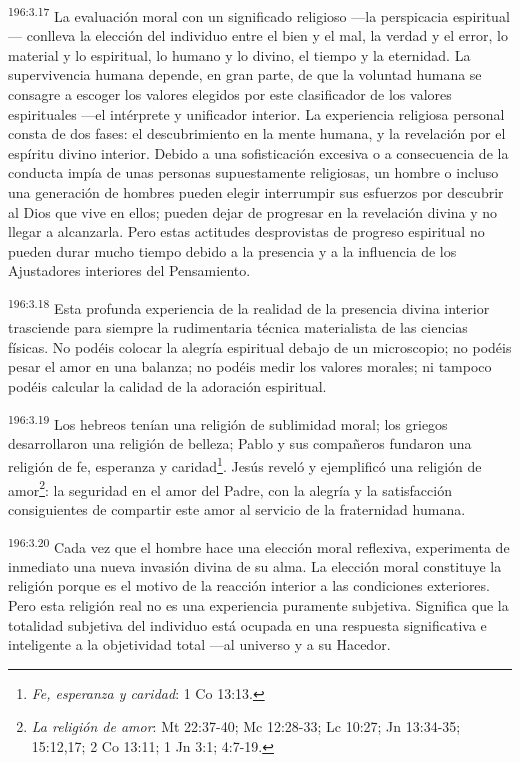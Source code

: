 \par 
\textsuperscript{196:3.17} La evaluación moral con un significado religioso ---la perspicacia espiritual--- conlleva la elección del individuo entre el bien y el mal, la verdad y el error, lo material y lo espiritual, lo humano y lo divino, el tiempo y la eternidad. La supervivencia humana depende, en gran parte, de que la voluntad humana se consagre a escoger los valores elegidos por este clasificador de los valores espirituales ---el intérprete y unificador interior. La experiencia religiosa personal consta de dos fases: el descubrimiento en la mente humana, y la revelación por el espíritu divino interior. Debido a una sofisticación excesiva o a consecuencia de la conducta impía de unas personas supuestamente religiosas, un hombre o incluso una generación de hombres pueden elegir interrumpir sus esfuerzos por descubrir al Dios que vive en ellos; pueden dejar de progresar en la revelación divina y no llegar a alcanzarla. Pero estas actitudes desprovistas de progreso espiritual no pueden durar mucho tiempo debido a la presencia y a la influencia de los Ajustadores interiores del Pensamiento.

\par 
\textsuperscript{196:3.18} Esta profunda experiencia de la realidad de la presencia divina interior trasciende para siempre la rudimentaria técnica materialista de las ciencias físicas. No podéis colocar la alegría espiritual debajo de un microscopio; no podéis pesar el amor en una balanza; no podéis medir los valores morales; ni tampoco podéis calcular la calidad de la adoración espiritual.

\par 
\textsuperscript{196:3.19} Los hebreos tenían una religión de sublimidad moral; los griegos desarrollaron una religión de belleza; Pablo y sus compañeros fundaron una religión de fe, esperanza y caridad\footnote{\textit{Fe, esperanza y caridad}: 1 Co 13:13.}. Jesús reveló y ejemplificó una religión de amor\footnote{\textit{La religión de amor}: Mt 22:37-40; Mc 12:28-33; Lc 10:27; Jn 13:34-35; 15:12,17; 2 Co 13:11; 1 Jn 3:1; 4:7-19.}: la seguridad en el amor del Padre, con la alegría y la satisfacción consiguientes de compartir este amor al servicio de la fraternidad humana.

\par 
\textsuperscript{196:3.20} Cada vez que el hombre hace una elección moral reflexiva, experimenta de inmediato una nueva invasión divina de su alma. La elección moral constituye la religión porque es el motivo de la reacción interior a las condiciones exteriores. Pero esta religión real no es una experiencia puramente subjetiva. Significa que la totalidad subjetiva del individuo está ocupada en una respuesta significativa e inteligente a la objetividad total ---al universo y a su Hacedor.

